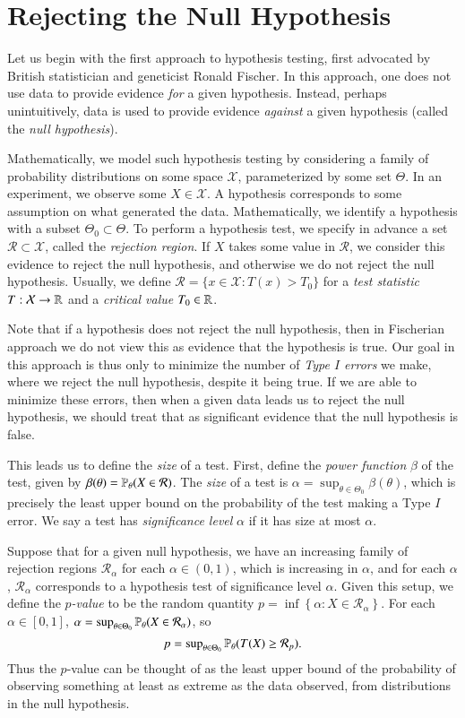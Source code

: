\section{Rejecting the Null Hypothesis}

Let us begin with the first approach to hypothesis testing, first advocated by British statistician and geneticist Ronald Fischer. In this approach, one does not use data to provide evidence \emph{for} a given hypothesis. Instead, perhaps unintuitively, data is used to provide evidence \emph{against} a given hypothesis (called the \emph{null hypothesis}).

Mathematically, we model such hypothesis testing by considering a family of probability distributions on some space $\mathcal{X}$, parameterized by some set $\Theta$. In an experiment, we observe some $X \in \mathcal{X}$. A hypothesis corresponds to some assumption on what generated the data. Mathematically, we identify a hypothesis with a subset $\Theta_0 \subset \Theta$. To perform a hypothesis test, we specify in advance a set $\mathcal{R} \subset \mathcal{X}$, called the \emph{rejection region}. If $X$ takes some value in $\mathcal{R}$, we consider this evidence to reject the null hypothesis, and otherwise we do not reject the null hypothesis. Usually, we define $\mathcal{R} = \{ x \in \mathcal{X} : T(x) > T_0 \}$ for a \emph{test statistic} $T: \mathcal{X} \to \operatorname{\mathbb{R}}$ and a \emph{critical value $T_0 \in \operatorname{\mathbb{R}}$}.

Note that if a hypothesis does not reject the null hypothesis, then in Fischerian approach we do not view this as evidence that the hypothesis is true. Our goal in this approach is thus only to minimize the number of \emph{Type $I$ errors} we make, where we reject the null hypothesis, despite it being true. If we are able to minimize these errors, then when a given data leads us to reject the null hypothesis, we should treat that as significant evidence that the null hypothesis is false.

This leads us to define the \emph{size} of a test. First, define the \emph{power function} $\beta$ of the test, given by $\beta(\theta) = \operatorname{\mathbb{P}}_\theta(X \in \mathcal{R})$. The \emph{size} of a test is $\alpha = \sup_{\theta \in \Theta_0} \beta(\theta)$, which is precisely the least upper bound on the probability of the test making a Type $I$ error. We say a test has \emph{significance level} $\alpha$ if it has size at most $\alpha$.

Suppose that for a given null hypothesis, we have an increasing family of rejection regions $\mathcal{R}_\alpha$ for each $\alpha \in (0,1)$, which is increasing in $\alpha$, and for each $\alpha$, $\mathcal{R}_\alpha$ corresponds to a hypothesis test of significance level $\alpha$. Given this setup, we define the \emph{$p$-value} to be the random quantity $p = \inf \left\{ \alpha: X \in \mathcal{R}_\alpha \right\}$. For each $\alpha \in [0,1]$, $\alpha = \sup\nolimits_{\theta \in \Theta_0} \operatorname{\mathbb{P}}_\theta( X \in \mathcal{R}_\alpha )$, so
%
\[ p = \sup\nolimits_{\theta \in \Theta_0} \operatorname{\mathbb{P}}_\theta( T(X) \geq \mathcal{R}_p ). \]
%
Thus the $p$-value can be thought of as the least upper bound of the probability of observing something at least as extreme as the data observed, from distributions in the null hypothesis.

